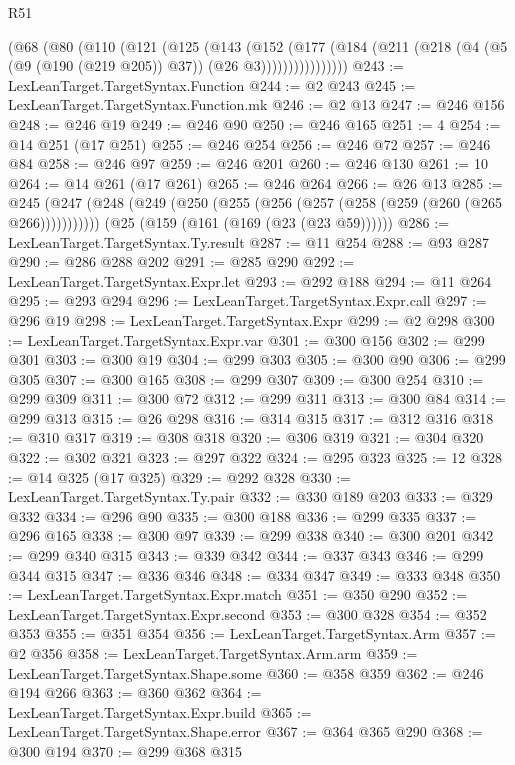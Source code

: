 \begin{lexlean}{R51}
\begin{coremodule}
          (@68
            (@80
              (@110
                (@121
                  (@125
                    (@143
                      (@152
                        (@177
                          (@184
                            (@211 (@218 (@4 (@5 (@9 (@190 (@219 @205)) @37)) (@26 @3))))))))))))))))
@243 := LexLeanTarget.TargetSyntax.Function
@244 := @2 @243
@245 := LexLeanTarget.TargetSyntax.Function.mk
@246 := @2 @13
@247 := @246 @156
@248 := @246 @19
@249 := @246 @90
@250 := @246 @165
@251 := 4
@254 := @14 @251 (@17 @251)
@255 := @246 @254
@256 := @246 @72
@257 := @246 @84
@258 := @246 @97
@259 := @246 @201
@260 := @246 @130
@261 := 10
@264 := @14 @261 (@17 @261)
@265 := @246 @264
@266 := @26 @13
@285 := @245
    (@247 (@248 (@249 (@250 (@255 (@256 (@257 (@258 (@259 (@260 (@265 @266)))))))))))
    (@25 (@159 (@161 (@169 (@23 (@23 @59))))))
@286 := LexLeanTarget.TargetSyntax.Ty.result
@287 := @11 @254
@288 := @93 @287
@290 := @286 @288 @202
@291 := @285 @290
@292 := LexLeanTarget.TargetSyntax.Expr.let
@293 := @292 @188
@294 := @11 @264
@295 := @293 @294
@296 := LexLeanTarget.TargetSyntax.Expr.call
@297 := @296 @19
@298 := LexLeanTarget.TargetSyntax.Expr
@299 := @2 @298
@300 := LexLeanTarget.TargetSyntax.Expr.var
@301 := @300 @156
@302 := @299 @301
@303 := @300 @19
@304 := @299 @303
@305 := @300 @90
@306 := @299 @305
@307 := @300 @165
@308 := @299 @307
@309 := @300 @254
@310 := @299 @309
@311 := @300 @72
@312 := @299 @311
@313 := @300 @84
@314 := @299 @313
@315 := @26 @298
@316 := @314 @315
@317 := @312 @316
@318 := @310 @317
@319 := @308 @318
@320 := @306 @319
@321 := @304 @320
@322 := @302 @321
@323 := @297 @322
@324 := @295 @323
@325 := 12
@328 := @14 @325 (@17 @325)
@329 := @292 @328
@330 := LexLeanTarget.TargetSyntax.Ty.pair
@332 := @330 @189 @203
@333 := @329 @332
@334 := @296 @90
@335 := @300 @188
@336 := @299 @335
@337 := @296 @165
@338 := @300 @97
@339 := @299 @338
@340 := @300 @201
@342 := @299 @340 @315
@343 := @339 @342
@344 := @337 @343
@346 := @299 @344 @315
@347 := @336 @346
@348 := @334 @347
@349 := @333 @348
@350 := LexLeanTarget.TargetSyntax.Expr.match
@351 := @350 @290
@352 := LexLeanTarget.TargetSyntax.Expr.second
@353 := @300 @328
@354 := @352 @353
@355 := @351 @354
@356 := LexLeanTarget.TargetSyntax.Arm
@357 := @2 @356
@358 := LexLeanTarget.TargetSyntax.Arm.arm
@359 := LexLeanTarget.TargetSyntax.Shape.some
@360 := @358 @359
@362 := @246 @194 @266
@363 := @360 @362
@364 := LexLeanTarget.TargetSyntax.Expr.build
@365 := LexLeanTarget.TargetSyntax.Shape.error
@367 := @364 @365 @290
@368 := @300 @194
@370 := @299 @368 @315

\end{coremodule}
\end{lexlean}
